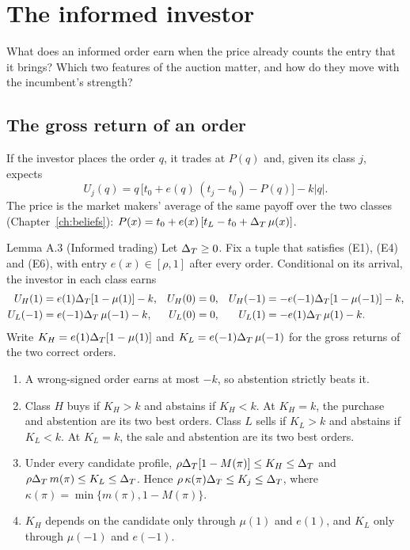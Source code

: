 \chapter{The informed investor}\label{ch:trading}

\begin{chapterplan}
What does an informed order earn when the price already counts the entry that it brings? Which two features of
the auction matter, and how do they move with the incumbent's strength?
\end{chapterplan}

\section{The gross return of an order}\label{sec:trading-returns}

If the investor places the order \(q\), it trades at \(P(q)\) and, given its class \(j\), expects
\begin{equation}\label{eq:trading-objective}
U_j(q)=q\,\bigl[t_0+e(q)\,(t_j-t_0)-P(q)\bigr]-k|q| .
\end{equation}
The price is the market makers' average of the same payoff over the two classes (Chapter~\ref{ch:beliefs}):
\(P(x)=t_0+e(x)\,[t_L-t_0+\Delta_T\,\mu(x)]\).

\begin{paperresult}{Lemma A.3 (Informed trading)}
Let \(\Delta_T\ge0\). Fix a tuple that satisfies (E1), (E4) and (E6), with entry \(e(x)\in[\rho,1]\) after every order.
Conditional on its arrival, the investor in each class earns
\[
\begin{aligned}
U_H(1)&=e(1)\Delta_T[1-\mu(1)]-k,& U_H(0)&=0,& U_H(-1)&=-e(-1)\Delta_T[1-\mu(-1)]-k,\\
U_L(-1)&=e(-1)\Delta_T\,\mu(-1)-k,& U_L(0)&=0,& U_L(1)&=-e(1)\Delta_T\,\mu(1)-k.
\end{aligned}
\]
Write \(K_H=e(1)\Delta_T[1-\mu(1)]\) and \(K_L=e(-1)\Delta_T\,\mu(-1)\) for the gross returns of the two correct orders.
\begin{enumerate}[label=(\alph*)]
\item A wrong-signed order earns at most \(-k\), so abstention strictly beats it.
\item Class \(H\) buys if \(K_H>k\) and abstains if \(K_H<k\). At \(K_H=k\), the purchase and abstention are its two
best orders. Class \(L\) sells if \(K_L>k\) and abstains if \(K_L<k\). At \(K_L=k\), the sale and abstention are
its two best orders.
\item Under every candidate profile, \(\rho\Delta_T[1-M(\pi)]\le K_H\le\Delta_T\) and \(\rho\Delta_T\,m(\pi)\le K_L\le\Delta_T\).
Hence \(\rho\,\kappa(\pi)\Delta_T\le K_j\le\Delta_T\), where \(\kappa(\pi)=\min\{m(\pi),1-M(\pi)\}\).
\item \(K_H\) depends on the candidate only through \(\mu(1)\) and \(e(1)\), and \(K_L\) only through \(\mu(-1)\)
and \(e(-1)\).
\end{enumerate}
\end{paperresult}

